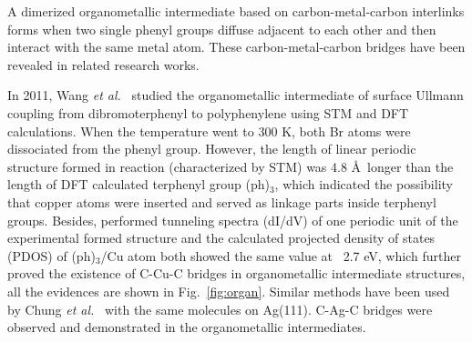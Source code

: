 \documentclass[%
 reprint,
 amsmath,amssymb,
 aps,
prb,
]{revtex4-2}
\begin{document}
A dimerized organometallic intermediate based on carbon-metal-carbon interlinks forms when two single phenyl groups diffuse adjacent to each other and then interact with the same metal atom. These carbon-metal-carbon bridges have been revealed in related research works. 

In 2011, Wang \textit{et al.}~\cite{jacs2011} studied the organometallic intermediate of surface Ullmann coupling from dibromoterphenyl to polyphenylene using STM and DFT calculations. When the temperature went to 300 K, both Br atoms were dissociated from the phenyl group. However, the length of linear periodic structure formed in reaction (characterized by STM) was 4.8 \AA\ longer than the length of DFT calculated terphenyl group (ph)$_{3}$, which indicated the possibility that copper atoms were inserted and served as linkage parts inside terphenyl groups. Besides, performed tunneling spectra (dI/dV) of one periodic unit of the experimental formed structure and the calculated projected density of states (PDOS) of (ph)$_{3}$/Cu atom both showed the same value at ~2.7 eV, which further proved the existence of C-Cu-C bridges in organometallic intermediate structures, all the evidences are shown in Fig.~\ref{fig:organ}. Similar methods have been used by Chung \textit{et al.}~\cite{PCCP2012} with the same molecules on Ag(111). C-Ag-C bridges were observed and demonstrated in the organometallic intermediates.
\end{document}
